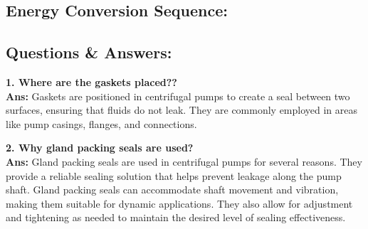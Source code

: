 \documentclass[12pt]{article}
\begin{document}
\subsection*{Energy Conversion Sequence:}
\vspace*{0.5cm}
\vspace*{0.5cm}

\subsection*{Questions \& Answers:}

\textbf{1. Where are the gaskets placed??}\\
\textbf{Ans:} Gaskets are positioned in centrifugal pumps to create a seal between two surfaces, ensuring that fluids do not leak. They are commonly employed in areas like pump casings, flanges, and connections.

\vspace*{0.3cm}\hspace*{-0.035\linewidth}
\textbf{2. Why gland packing seals are used?}\\
\textbf{Ans:} Gland packing seals are used in centrifugal pumps for several reasons. They provide a reliable sealing solution that helps prevent leakage along the pump shaft. Gland packing seals can accommodate shaft movement and vibration, making them suitable for dynamic applications. They also allow for adjustment and tightening as needed to maintain the desired level of sealing effectiveness.
\end{document}
